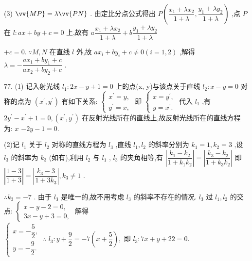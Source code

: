 (3) $\vv{MP} = \lambda \vv{PN}$ . 由定比分点公式得出 $P\left( {\dfrac{{x}_{1} + \lambda {x}_{2}}{1 + \lambda },\dfrac{{y}_{1} + \lambda {y}_{2}}{1 + \lambda }}\right)$ ,点 $P$ 在 $l : {ax} + {by} + c = 0$ 上,故有 $a\dfrac{{x}_{1} + \lambda {x}_{2}}{1 + \lambda } + b\dfrac{{y}_{1} + \lambda {y}_{2}}{1 + \lambda }$

$+ c = 0.\;\because M,N$ 在直线 $l$ 外,故 $a{x}_{i} + b{y}_{i} + c \neq  0\left( {i = 1,2}\right)$ ,解得 $\lambda  =  - \dfrac{a{x}_{1} + b{y}_{1} + c}{a{x}_{2} + b{y}_{2} + c}$ .

77. (1) 记入射光线 ${l}_{1} : {2x} - y + 1 = 0$ 上的点(x, y)与该点关于直线 ${l}_{2} : x - y = 0$ 对称的点为 $\left( {{x}^{\prime },{y}^{\prime }}\right)$ 有如下关系: $\left\{  \begin{array}{l} {x}^{\prime } = y, \\  {y}^{\prime } = x, \end{array}\right.$ 即 $\left\{  \begin{array}{l} x = {y}^{\prime }, \\  y = {x}^{\prime }. \end{array}\right.$ 代入 ${l}_{1}$ ,有 $2{y}^{\prime } - {x}^{\prime } + 1 = 0,\left( {{x}^{\prime },{y}^{\prime }}\right)$ 在反射光线所在的直线上,故反射光线所在的直线方程为: $x$  $- {2y} - 1 = 0.$

(2)记 ${l}_{1}$ 关于 ${l}_{2}$ 对称的直线方程为 ${l}_{3}$ ,直线 ${l}_{1},{l}_{2}$ 的斜率分别为 ${k}_{1} = 1,{k}_{2} = 3$ ,设 ${l}_{3}$ 的斜率为 ${k}_{3}$ (如有),利用 ${l}_{2}$ 与 ${l}_{1}$ , ${l}_{3}$ 的夹角相等,有 $\left| \dfrac{{k}_{1} - {k}_{2}}{1 + {k}_{1}{k}_{2}}\right|  = \left| \dfrac{{k}_{3} - {k}_{2}}{1 + {k}_{3}{k}_{2}}\right|$ 即 $\left| \dfrac{1 - 3}{1 + 3}\right|  = \left| \dfrac{{k}_{3} - 3}{1 + 3{k}_{3}}\right| ,{k}_{3} \neq  1$ .

$\therefore {k}_{3} =  - 7$ . 由于 ${l}_{3}$ 是唯一的,故不用考虑 ${l}_{3}$ 的斜率不存在的情况. ${l}_{3}$ 过 ${l}_{1},{l}_{2}$ 的交点: $\left\{  \begin{array}{l} x - y - 2 = 0, \\  {3x} - y + 3 = 0, \end{array}\right.$ 解得 $\left\{  {\begin{array}{l} x =  - \dfrac{5}{2}, \\  y =  - \dfrac{9}{2}. \end{array}\;\therefore \;{l}_{3} : y + \dfrac{9}{2} =  - 7\left( {x + \dfrac{5}{2}}\right) ,\text{ 即 }{l}_{3} : {7x} + y + {22} = 0.}\right.$


